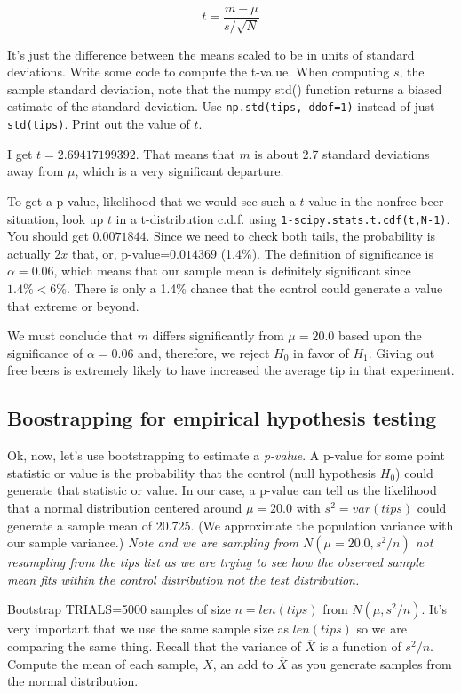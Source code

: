 \begin{fullwidth}
\[\tag{t-value}
t = \frac{m - \mu}{s / \sqrt{N}}
\]

\noindent It's just the difference between the means scaled to be in units of standard deviations.  Write some code to compute the t-value. When computing $s$, the sample standard deviation, note that the numpy std() function returns a biased estimate of the standard deviation. Use {\tt np.std(tips, ddof=1)} instead of just {\tt std(tips)}. Print out the value of $t$.

I get $t = 2.69417199392$. That means that $m$ is about 2.7 standard deviations away from $\mu$, which is a very significant departure. 

\step  To get a p-value, likelihood that we would see such a $t$ value in the nonfree beer situation, look up $t$ in a t-distribution c.d.f. using {\tt 1-scipy.stats.t.cdf(t,N-1)}. You should get $0.0071844$. Since we need to check both tails, the probability is actually $2x$ that, or, p-value=$0.014369$ (1.4\%). The definition of significance is $\alpha = 0.06$, which means that our sample mean is definitely significant since $1.4\% < 6\%$.  There is only a 1.4\% chance that the control could generate a value that extreme or beyond.

We must conclude that $m$ differs significantly from $\mu = 20.0$ based upon the significance of $\alpha=0.06$ and, therefore, we reject $H_0$ in favor of $H_1$.  Giving out free beers is extremely likely to have increased the average tip in that experiment.

\subsection{Boostrapping for empirical hypothesis testing}

\setcounter{problem}{1}

Ok, now, let's use bootstrapping to estimate a {\em p-value}. A p-value for some point statistic or value is the probability that the control (null hypothesis $H_0$) could generate that statistic or value. In our case, a p-value can tell us the likelihood that a normal distribution centered around $\mu=20.0$ with $s^2=var(tips)$ could generate a sample mean of 20.725. (We approximate the population variance with our sample variance.) {\em Note and we are sampling from $N(\mu=20.0,s^2/n)$ not resampling from the tips list as we are trying to see how the observed sample mean fits within the control distribution not the test distribution.}

\step Bootstrap TRIALS=5000 samples of size $n=len(tips)$ from $N(\mu, s^2/n)$. It's very important that we use the same sample size as $len(tips)$ so we are comparing the same thing. Recall that the variance of $\overline{X}$ is a function of $s^2/n$. Compute the mean of each sample, $X$, an add to $\overline{X}$ as you generate samples from the normal distribution.


\end{fullwidth}
